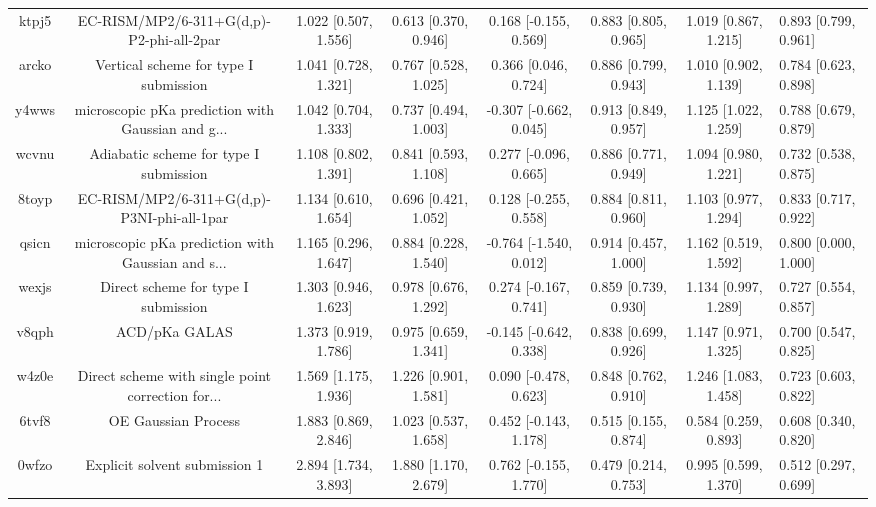 \documentclass{article}
\begin{document}
\begin{center}
\begin{longtable}{|ccccccc|}
 ktpj5 &           EC-RISM/MP2/6-311+G(d,p)-P2-phi-all-2par &  1.022 [0.507, 1.556] &  0.613 [0.370, 0.946] &   0.168 [-0.155, 0.569] &  0.883 [0.805, 0.965] &   1.019 [0.867, 1.215] &   0.893 [0.799, 0.961] \\
 arcko &              Vertical scheme for type I submission &  1.041 [0.728, 1.321] &  0.767 [0.528, 1.025] &    0.366 [0.046, 0.724] &  0.886 [0.799, 0.943] &   1.010 [0.902, 1.139] &   0.784 [0.623, 0.898] \\
 y4wws &  microscopic pKa prediction with Gaussian and g... &  1.042 [0.704, 1.333] &  0.737 [0.494, 1.003] &  -0.307 [-0.662, 0.045] &  0.913 [0.849, 0.957] &   1.125 [1.022, 1.259] &   0.788 [0.679, 0.879] \\
 wcvnu &             Adiabatic scheme for type I submission &  1.108 [0.802, 1.391] &  0.841 [0.593, 1.108] &   0.277 [-0.096, 0.665] &  0.886 [0.771, 0.949] &   1.094 [0.980, 1.221] &   0.732 [0.538, 0.875] \\
 8toyp &         EC-RISM/MP2/6-311+G(d,p)-P3NI-phi-all-1par &  1.134 [0.610, 1.654] &  0.696 [0.421, 1.052] &   0.128 [-0.255, 0.558] &  0.884 [0.811, 0.960] &   1.103 [0.977, 1.294] &   0.833 [0.717, 0.922] \\
 qsicn &  microscopic pKa prediction with Gaussian and s... &  1.165 [0.296, 1.647] &  0.884 [0.228, 1.540] &  -0.764 [-1.540, 0.012] &  0.914 [0.457, 1.000] &   1.162 [0.519, 1.592] &   0.800 [0.000, 1.000] \\
 wexjs &                Direct scheme for type I submission &  1.303 [0.946, 1.623] &  0.978 [0.676, 1.292] &   0.274 [-0.167, 0.741] &  0.859 [0.739, 0.930] &   1.134 [0.997, 1.289] &   0.727 [0.554, 0.857] \\
 v8qph &                                      ACD/pKa GALAS &  1.373 [0.919, 1.786] &  0.975 [0.659, 1.341] &  -0.145 [-0.642, 0.338] &  0.838 [0.699, 0.926] &   1.147 [0.971, 1.325] &   0.700 [0.547, 0.825] \\
 w4z0e &  Direct scheme with single point correction for... &  1.569 [1.175, 1.936] &  1.226 [0.901, 1.581] &   0.090 [-0.478, 0.623] &  0.848 [0.762, 0.910] &   1.246 [1.083, 1.458] &   0.723 [0.603, 0.822] \\
 6tvf8 &                                OE Gaussian Process &  1.883 [0.869, 2.846] &  1.023 [0.537, 1.658] &   0.452 [-0.143, 1.178] &  0.515 [0.155, 0.874] &   0.584 [0.259, 0.893] &   0.608 [0.340, 0.820] \\
 0wfzo &                      Explicit solvent submission 1 &  2.894 [1.734, 3.893] &  1.880 [1.170, 2.679] &   0.762 [-0.155, 1.770] &  0.479 [0.214, 0.753] &   0.995 [0.599, 1.370] &   0.512 [0.297, 0.699] \\

\end{longtable}
\end{center}
\end{document}
